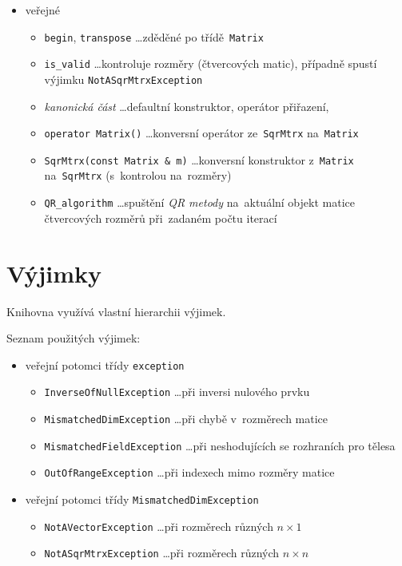 \documentclass[11pt,a4paper]{article}
\theoremstyle{remark}
\begin{document}
\begin{itemize}
  \item veřejné
  \begin{itemize}
    \item \verb=begin=, \verb=transpose= \ldots zděděné po třídě~\verb=Matrix=
    \item \verb=is_valid= \ldots kontroluje rozměry (čtvercových matic),
      případně spustí výjimku \verb=NotASqrMtrxException=
    \item \emph{kanonická část\/} \ldots defaultní konstruktor, operátor
      přiřazení, 
    \item \verb=operator Matrix()= \ldots konversní operátor ze~\verb=SqrMtrx=
      na~\verb=Matrix=
    \item \verb=SqrMtrx(const Matrix & m)= \ldots konversní konstruktor
      z~\verb=Matrix= na~\verb=SqrMtrx= (s~kontrolou na~rozměry)
    \item \verb=QR_algorithm= \ldots spuštění \emph{QR metody\/} \cite{qr-meth}
      na~aktuální objekt matice čtvercových rozměrů při~zadaném počtu iterací
  \end{itemize}
\end{itemize}

\section{Výjimky}

Knihovna využívá vlastní hierarchii výjimek.

Seznam použitých výjimek:

\begin{itemize}
  \item veřejní potomci třídy \verb=exception=
  \begin{itemize}
    \item \verb=InverseOfNullException= \ldots při inversi nulového prvku
    \item \verb=MismatchedDimException= \ldots při chybě v~rozměrech matice
    \item \verb=MismatchedFieldException= \ldots při neshodujících se
      rozhraních pro tělesa
    \item \verb=OutOfRangeException= \ldots při indexech mimo rozměry matice
  \end{itemize}
  \item veřejní potomci třídy \verb=MismatchedDimException=
  \begin{itemize}
    \item \verb=NotAVectorException= \ldots při rozměrech různých $n \times 1$
    \item \verb=NotASqrMtrxException= \ldots při rozměrech různých $n \times n$
  \end{itemize}
\end{itemize}
\end{document}

